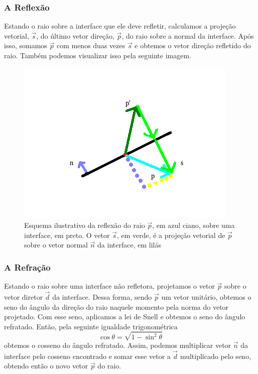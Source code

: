             \subsubsection{A Reflexão}
            
                Estando o raio sobre a interface que ele deve refletir, calculamos a projeção vetorial, $\vec{s}$, do último vetor direção, $\vec{p}$, do raio sobre a normal da interface. Após isso, somamos $\vec{p}$ com menos duas vezes $\vec{s}$ e obtemos o vetor direção refletido do raio. Também podemos visualizar isso pela seguinte imagem.
                
                \begin{figure}[H]
                    \centering \includegraphics[scale=.8]{imagens/RTimages/reflect.png}
                    \caption{Esquema ilustrativo da reflexão do raio $\vec{p}$, em azul ciano, sobre uma interface, em preto. O vetor $\vec{s}$, em verde, é a projeção vetorial de $\vec{p}$ sobre o vetor normal $\vec{n}$ da interface, em lilás}
                    \label{fig:reflect}
                \end{figure}
            
            \subsubsection{A Refração}
            
                Estando o raio sobre uma interface não refletora, projetamos o vetor $\vec{p}$ sobre o vetor diretor $\vec{d}$ da interface. Dessa forma, sendo $\vec{p}$ um vetor unitário, obtemos o seno do ângulo da direção do raio naquele momento pela norma do vetor projetado. Com esse seno, aplicamos a lei de Snell e obtemos o seno do ângulo refratado. Então, pela seguinte igualdade trigonométrica
                \begin{equation*}
                    \cos{\theta} = \sqrt{1 - \sin^2{\theta}}
                \end{equation*}
                obtemos o cosseno do ângulo refratado. Assim, podemos multiplicar vetor $\vec{n}$ da interface pelo cosseno encontrado e somar esse vetor a $\vec{d}$ multiplicado pelo seno, obtendo então o novo vetor $\vec{p}$ do raio.
                
